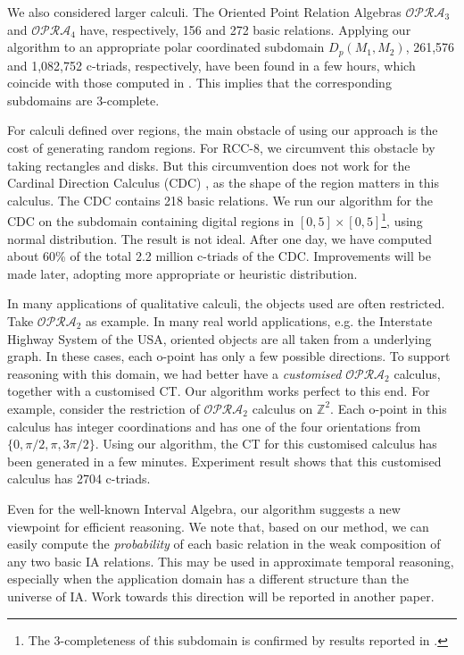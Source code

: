 \documentclass{llncs}
\newcommand{\opra}{\mathcal{OPRA}}
\begin{document}
We also considered larger calculi. The Oriented Point Relation Algebras $\opra_3$ and $\opra_4$ have, respectively, 156 and 272 basic relations. Applying our algorithm to an appropriate polar coordinated subdomain $D_p(M_1,M_2)$, 261,576 and 1,082,752 c-triads, respectively, have been found in a few hours, which coincide with those computed in \cite{MM10}. This implies that the corresponding subdomains are 3-complete.

For calculi defined over regions, the main obstacle of using our approach is the cost of generating random regions. For RCC-8, we circumvent this obstacle by taking rectangles and disks. But this circumvention does not work for the Cardinal Direction Calculus (CDC) \cite{Goyal00}, as the shape of the region matters in this calculus. The CDC contains 218 basic relations. We run our algorithm for the CDC on the subdomain containing digital regions in $[0,5]\times [0,5]$\footnote{The 3-completeness of this subdomain is confirmed by results reported in \cite{LiuZLY10}.}, using normal distribution. The result is not ideal. After one day, we have computed about 60\% of the total 2.2 million c-triads of the CDC. Improvements will be made later, adopting more appropriate or heuristic distribution.

In many applications of qualitative calculi, the objects used are often restricted. Take $\opra_2$ as example. In many real world applications, e.g. the  Interstate Highway System of the USA, oriented objects are all taken from a underlying graph. In these cases, each o-point has only a few possible directions. To support reasoning with this domain, we had better have a \emph{customised} $\opra_2$ calculus, together with a customised CT.  Our algorithm works perfect to this end. For example, consider the restriction of $\opra_2$ calculus on $\mathbb{Z}^2$. Each o-point in this calculus has integer coordinations and has one of the four orientations from $\{0,\pi/2,\pi,3\pi/2\}$. Using our algorithm, the CT for this customised calculus has been generated in a few minutes. Experiment result shows that this customised calculus has 2704 c-triads.


Even for the well-known Interval Algebra, our algorithm suggests a new viewpoint for efficient reasoning. We note that, based on our method, we can easily compute the \emph{probability} of each basic relation in the weak composition of any two basic IA relations. This may be used in approximate temporal reasoning, especially when
the application domain has a different structure than the universe of IA. Work towards this direction will be reported in another paper.
\end{document}
